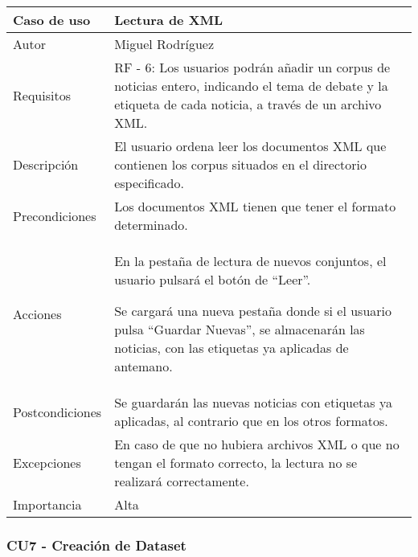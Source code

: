 \begin{center}
\begin{tabular}{ | m{3cm} | m{10cm}| } 
\hline
Caso de uso & Lectura de XML \\ 
\hline
Autor & Miguel Rodríguez \\ 
\hline
Requisitos & RF - 6: Los usuarios podrán añadir un corpus de noticias entero, indicando el tema de debate y la etiqueta de cada noticia, a través de un archivo XML. \\ 
\hline
Descripción & El usuario ordena leer los documentos XML que contienen los corpus situados en el directorio especificado.\\
\hline
Precondiciones & Los documentos XML tienen que tener el formato determinado. \\
\hline
Acciones & En la pestaña de lectura de nuevos conjuntos, el usuario pulsará el botón de ``Leer''. 

Se cargará una nueva pestaña donde si el usuario pulsa ``Guardar Nuevas'', se almacenarán las noticias, con las etiquetas ya aplicadas de antemano. \\
\hline
Postcondiciones & Se guardarán las nuevas noticias con etiquetas ya aplicadas, al contrario que en los otros formatos. \\
\hline
Excepciones & En caso de que no hubiera archivos XML o que no tengan el formato correcto, la lectura no se realizará correctamente. \\
\hline 
Importancia & Alta \\
\hline 
\end{tabular}
\end{center}

\subsubsection{CU7 - Creación de Dataset}

